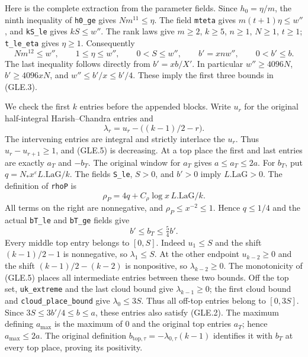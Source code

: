 Here is the complete extraction from the parameter fields.  Since
$h_0=\eta/m$, the ninth inequality of \texttt{h0\_ge} gives
$Nm^{11}\le\eta$.  The field \texttt{mteta} gives
$m(t+1)\eta\le w''$, and \texttt{kS\_le} gives $kS\le w''$.
The rank laws give $m\ge2$, $k\ge5$, $n\ge1$, $N\ge1$, $t\ge1$;
\texttt{t\_le\_eta} gives $\eta\ge1$.  Consequently
\[
 Nm^{12}\le w'',\qquad 1\le\eta\le w'',\qquad
 0<S\le w'',\qquad b'=xnw'',\qquad 0<b'\le b.
 \tag{GLE.4}
\]
The last inequality follows directly from $b'=xb/X'$.
In particular $w''\ge4096N$, $b'\ge4096xN$, and
$w''\le b'/x\le b'/4$.  These imply the first three bounds in (GLE.3).

We check the first $k$ entries before the appended blocks.  Write
$u_r$ for the original half-integral Harish--Chandra entries and
\[
 \lambda_r=u_r-\bigl((k-1)/2-r\bigr).
 \tag{GLE.5}
\]
The intervening entries are integral and strictly interlace the $u_r$.
Thus $u_r-u_{r+1}\ge1$, and (GLE.5) is decreasing.  At a top place the
first and last entries are exactly $a_T$ and $-b_T$.  The original
window for $a_T$ gives $a\le a_T\le2a$.
For $b_T$, put $q=N_*x^\varepsilon L.\mathrm{LaG}/k$.
The fields \texttt{S\_le}, $S>0$, and $b'>0$ imply
$L.\mathrm{LaG}>0$.  The definition of \texttt{rhoP} is
\[
 \rho_P=4q+C_\rho\log x\,L.\mathrm{LaG}/k.
\]
All terms on the right are nonnegative, and
$\rho_P\le x^{-2}\le1$.  Hence $q\le1/4$ and the actual
\texttt{bT\_le} and \texttt{bT\_ge} fields give
\[
 b'\le b_T\le\tfrac54 b'.                       \tag{GLE.6}
\]
Every middle top entry belongs to $[0,S]$.  Indeed $u_1\le S$ and
the shift $(k-1)/2-1$ is nonnegative, so $\lambda_1\le S$.
At the other endpoint $u_{k-2}\ge0$ and the shift
$(k-1)/2-(k-2)$ is nonpositive, so $\lambda_{k-2}\ge0$.
The monotonicity of (GLE.5) places all intermediate entries between
these two bounds.  Off the top set, \texttt{uk\_extreme} and the
last cloud bound give $\lambda_{k-1}\ge0$; the first cloud bound and
\texttt{cloud\_place\_bound} give $\lambda_0\le3S$.
Thus all off-top entries belong to $[0,3S]$.
Since $3S\le3b'/4\le b\le a$, these entries also satisfy (GLE.2).
The maximum defining $a_{\max}$ is the maximum of $0$ and the original
top entries $a_T$; hence $a_{\max}\le2a$.  The original definition
$b_{\mathrm{top},\tau}=-\lambda_{0,\tau}(k-1)$ identifies it with
$b_T$ at every top place, proving its positivity.

